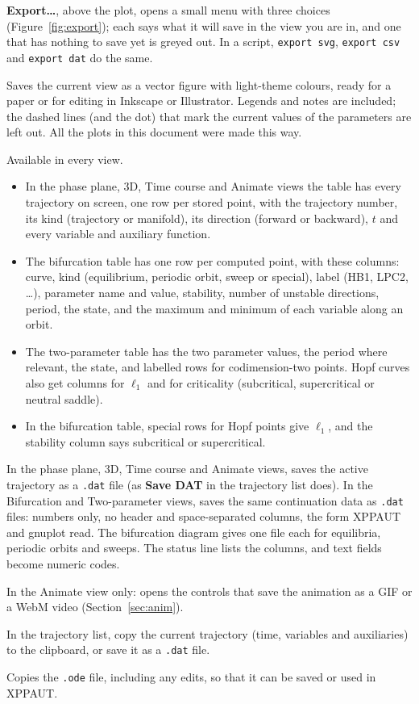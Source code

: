 \documentclass[11pt,a4paper]{article}
\newcommand{\XPP}{\textsf{XPPAUT}}
\newcommand{\ui}[1]{\textsf{\textbf{#1}}}          %
\begin{document}
\ui{Export\ldots}, above the plot, opens a small menu with three choices (Figure~\ref{fig:export}); each says what it will save in the view you are in, and one that has nothing to save yet is greyed out. In a script, \texttt{export svg}, \texttt{export csv} and \texttt{export dat} do the same.
\begin{description}[font=\sffamily\bfseries]
  \item[SVG] Saves the current view as a vector figure with light-theme colours, ready for a paper or for editing in Inkscape or Illustrator. Legends and notes are included; the dashed lines (and the dot) that mark the current values of the parameters are left out. All the plots in this document were made this way.
  \item[CSV] Available in every view.
  \begin{itemize}
    \item In the phase plane, 3D, Time course and Animate views the table has every trajectory on screen, one row per stored point, with the trajectory number, its kind (trajectory or manifold), its direction (forward or backward), $t$ and every variable and auxiliary function.
    \item The bifurcation table has one row per computed point, with these columns: curve, kind (equilibrium, periodic orbit, sweep or special), label (HB1, LPC2, \ldots), parameter name and value, stability, number of unstable directions, period, the state, and the maximum and minimum of each variable along an orbit.
    \item The two-parameter table has the two parameter values, the period where relevant, the state, and labelled rows for codimension-two points. Hopf curves also get columns for $\ell_1$ and for criticality (subcritical, supercritical or neutral saddle).
    \item In the bifurcation table, special rows for Hopf points give $\ell_1$, and the stability column says subcritical or supercritical.
  \end{itemize}
  \item[DAT] In the phase plane, 3D, Time course and Animate views, saves the active trajectory as a \texttt{.dat} file (as \ui{Save DAT} in the trajectory list does). In the Bifurcation and Two-parameter views, saves the same continuation data as \texttt{.dat} files: numbers only, no header and space-separated columns, the form \XPP{} and gnuplot read. The bifurcation diagram gives one file each for equilibria, periodic orbits and sweeps. The status line lists the columns, and text fields become numeric codes.
  \item[GIF] In the Animate view only: opens the controls that save the animation as a GIF or a WebM video (Section~\ref{sec:anim}).
  \item[Copy CSV, Save DAT] In the trajectory list, copy the current trajectory (time, variables and auxiliaries) to the clipboard, or save it as a \texttt{.dat} file.
  \item[Copy text] Copies the \texttt{.ode} file, including any edits, so that it can be saved or used in \XPP{}.
\end{description}
\end{document}
